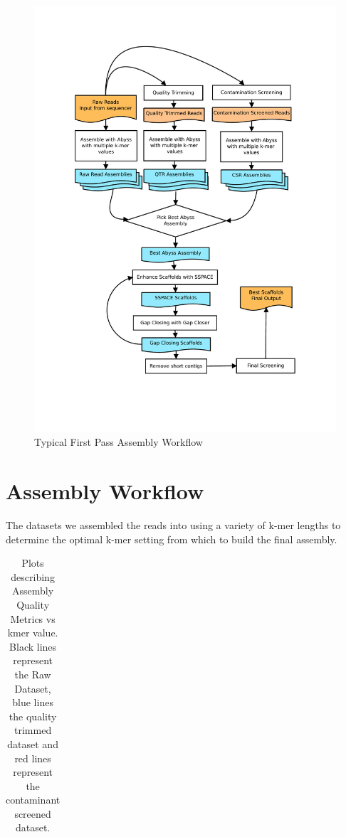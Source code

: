\documentclass{amsart}
\begin{document}
\begin{figure}[H]
\includegraphics[width=13cm]{Workflow.pdf}
\caption{Typical First Pass Assembly Workflow}
\label{fig:workflow}
\end{figure}



\newpage
\section{Assembly Workflow}

The datasets we assembled the reads into using a variety of k-mer lengths to determine the optimal k-mer setting from which to build the final assembly. 

\begin{table}[H]
\begin{center}
\begin{tabular}{c|c|c}
\end{tabular}
\end{center}
\caption{Plots describing Assembly Quality Metrics vs kmer value. Black lines represent the Raw Dataset, blue lines the quality trimmed dataset and red lines represent the contaminant screened dataset. }
\label{fig:aq_b}
\end{table}
\end{document}
